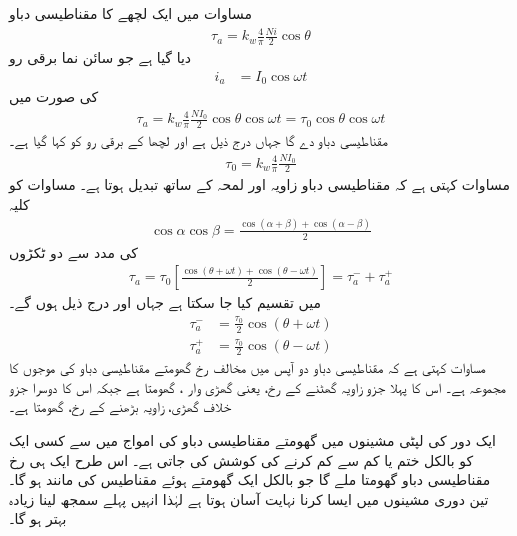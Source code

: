 مساوات   میں ایک لچھے کا مقناطیسی دباو
\begin{align}
\tau_a=k_w \frac{4}{\pi}\frac{Ni}{2} \cos \theta
\end{align}
دیا گیا ہے جو  سائن نما برقی رو
\begin{align}
i_a&=I_0 \cos \omega t
\end{align}
کی صورت میں
\begin{align}\label{مساوات_گھومتے_مشین_دباو_زاویہ_اور_وقت_پر_منحصر}
\tau_a=k_w \frac{4}{\pi} \frac{N I_0}{2} \cos \theta \cos \omega t=\tau_0 \cos \theta \cos \omega t
\end{align}
مقناطیسی دباو دے گا جہاں  درج ذیل ہے اور لچھا کے برقی رو کو  کہا گیا ہے۔
\begin{align}
\tau_0=k_w \frac{4}{\pi} \frac{N I_0}{2}
\end{align}
مساوات   کہتی ہے کہ  مقناطیسی دباو زاویہ  اور لمحہ  کے ساتھ تبدیل ہوتا ہے۔ مساوات  کو کلیہ 
\begin{align}\label{مساوات_گھومتے_مشین_کو_سائن_ٹکڑے}
\cos \alpha \cos \beta =\frac{\cos (\alpha +\beta) +\cos (\alpha -\beta)}{2}
\end{align}
کی مدد سے دو ٹکڑوں 
\begin{align}\label{مساوات_گھومتے_مشین_دو_مخالف_گھومتے_اجزاء}
\tau_a=\tau_0 \left [\frac{\cos (\theta +\omega t) +\cos (\theta -\omega t)}{2}\right]=\tau_a^{-}+\tau_a^{+}
\end{align}
میں تقسیم کیا جا سکتا ہے جہاں  اور  درج ذیل ہوں گے۔
\begin{align}
\tau_a^{-}&=\frac{\tau_0}{2} \cos (\theta +\omega t)\\
\tau_a^{+}&=\frac{\tau_0}{2} \cos (\theta -\omega t)
\end{align}
مساوات   کہتی ہے کہ  مقناطیسی دباو دو آپس میں مخالف رخ گھومتے  مقناطیسی دباو کی موجوں کا مجموعہ ہے۔ اس کا پہلا جزو  زاویہ  گھٹنے کے رخ،  یعنی گھڑی وار ، گھومتا ہے جبکہ اس کا دوسرا جزو  خلاف گھڑی، زاویہ بڑھنے کے رخ،  گھومتا ہے۔

ایک دور کی لپٹی مشینوں میں گھومتے مقناطیسی دباو کی امواج میں سے کسی ایک کو بالکل ختم یا کم سے کم کرنے کی کوشش کی جاتی ہے۔ اس طرح ایک ہی رخ  مقناطیسی دباو گھومتا ملے گا جو بالکل  ایک گھومتے ہوئے  مقناطیس کی مانند ہو گا۔ تین دوری  مشینوں میں ایسا کرنا نہایت آسان ہوتا ہے لہٰذا انہیں پہلے سمجھ لینا زیادہ بہتر ہو گا۔

